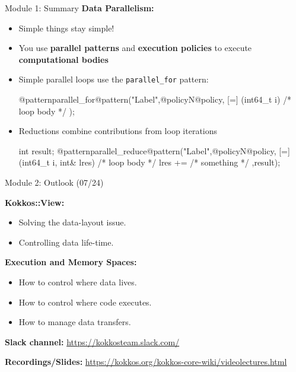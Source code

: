 \begin{frame}[fragile]{Module 1: Summary}
	\textbf{Data Parallelism:}
	\begin{itemize}
		\item Simple things stay simple!
		\item You use \textbf{parallel patterns} and \textbf{execution policies} to execute \textbf{computational bodies}
		\item Simple parallel loops use the \texttt{parallel\_for} pattern:
\begin{code}[linebackgroundcolor={\btLstHL<1->{3}{bodyColor}},frame=single]
  @patternparallel_for@pattern("Label",@policyN@policy, [=] (int64_t i) {
   /* loop body */
  });
\end{code}
\item Reductions combine contributions from loop iterations
\begin{code}[linebackgroundcolor={\btLstHL<1->{3}{bodyColor}},frame=single]
int result;
@patternparallel_reduce@pattern("Label",@policyN@policy, [=] (int64_t i, int& lres) {
   /* loop body */
    lres += /* something */
  },result);
\end{code}
\end{itemize}

\end{frame}


\begin{frame}{Module 2: Outlook (07/24)}

	\vspace{10pt}
	\textbf{Kokkos::View:}
	\begin{itemize}
		\item Solving the data-layout issue.
		\item Controlling data life-time.
	\end{itemize}

	\vspace{10pt}
	\textbf{Execution and Memory Spaces:}
	\begin{itemize}
		\item How to control where data lives.
		\item How to control where code executes.
		\item How to manage data transfers.
	\end{itemize}

	\vspace{10pt}
    \textbf{Slack channel:} {\scriptsize \url{https://kokkosteam.slack.com/}}
	
	\vspace{10pt}
	\textbf{Recordings/Slides:} {\scriptsize \url{https://kokkos.org/kokkos-core-wiki/videolectures.html}}

\end{frame}



